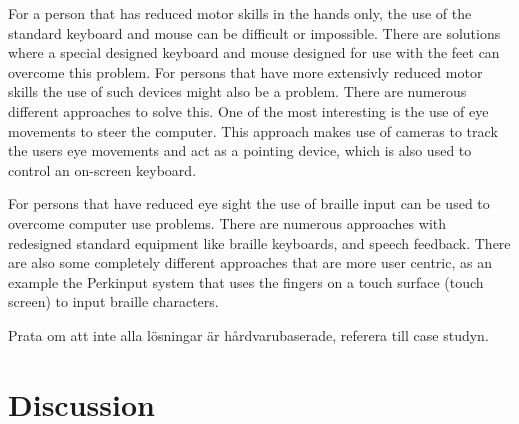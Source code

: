 
For a person that has reduced motor skills in the hands only, the use of the standard keyboard and mouse can be difficult or impossible. There are solutions where a special designed keyboard and mouse designed for use with the feet can overcome this problem.
For persons that have more extensivly reduced motor skills the use of such devices might also be a problem. There are numerous different approaches to solve this. One of the most interesting is the use of eye movements to steer the computer. This approach makes use of cameras to track the users eye movements and act as a pointing device, which is also used to control an on-screen keyboard. 

For persons that have reduced eye sight the use of braille input can be used to overcome computer use problems. There are numerous approaches with redesigned standard equipment like braille keyboards, and speech feedback. There are also some completely different approaches that are more user centric, as an example the Perkinput system that uses the fingers on a touch surface (touch screen) to input braille characters.

Prata om att inte alla lösningar är hårdvarubaserade, referera till case studyn.

\section{Discussion}

